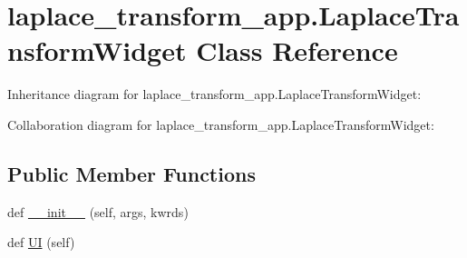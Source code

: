 \hypertarget{classlaplace__transform__app_1_1LaplaceTransformWidget}{}\section{laplace\+\_\+transform\+\_\+app.\+Laplace\+Transform\+Widget Class Reference}
\label{classlaplace__transform__app_1_1LaplaceTransformWidget}


Inheritance diagram for laplace\+\_\+transform\+\_\+app.\+Laplace\+Transform\+Widget\+:


Collaboration diagram for laplace\+\_\+transform\+\_\+app.\+Laplace\+Transform\+Widget\+:
\subsection*{Public Member Functions}
\begin{DoxyCompactItemize}
\item 
def \hyperlink{classlaplace__transform__app_1_1LaplaceTransformWidget_a95e291054dfa03a233636764d58cb04b}{\+\_\+\+\_\+init\+\_\+\+\_\+} (self, args, kwrds)
\item 
def \hyperlink{classlaplace__transform__app_1_1LaplaceTransformWidget_aa36b0a46696be18b7d4b7869e0ba5713}{UI} (self)
\end{DoxyCompactItemize}
